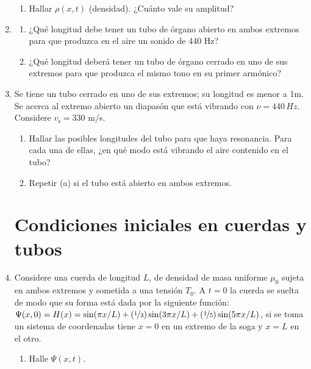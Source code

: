 \documentclass[11pt,spanish]{article}
\begin{document}
\begin{enumerate}
\begin{enumerate}
        \item Hallar $\rho(x,t)$ (densidad). ¿Cuánto vale su amplitud?
    \end{enumerate}


    \item
    \begin{enumerate}
        \item ¿Qué longitud debe tener un tubo de órgano abierto en ambos
        extremos para que produzca en el aire un sonido de 440 Hz?

        \item ¿Qué longitud deberá tener un tubo de órgano cerrado en uno de sus
        extremos para que produzca el mismo tono en su primer armónico?
    \end{enumerate}


    \item Se tiene un tubo cerrado en uno de sus extremos; su longitud es menor
    a 1m. Se acerca al extremo abierto un diapasón que está vibrando con
    $\nu=440\unit{\, Hz}$. Considere $v_\text{s}=330$ m/s.

    \begin{enumerate}
        \item Hallar las posibles longitudes del tubo para que haya resonancia.
        Para cada una de ellas, ¿en qué modo está vibrando el aire contenido en
        el tubo? 
        \item Repetir (a) si el tubo está abierto en ambos extremos.
    \end{enumerate}

\section*{Condiciones iniciales en cuerdas y tubos}


    \item Considere una cuerda de longitud $L$, de densidad de masa uniforme
    $\mu_{0}$ sujeta en ambos extremos y sometida a una tensión $T_{0}$. A $t=0$
    la cuerda se suelta de modo que su forma está dada por la siguiente función:
    $\Psi(x,0)=H(x)=\sin(\pi x/L)+(\nicefrac{1}{3})\sin(3\pi x/L)+(\nicefrac{1}{5})\sin(5\pi x/L)$,
    si se toma un sistema de coordenadas tiene $x=0$ en un extremo de la soga y
    $x=L$ en el otro. 

    \begin{enumerate}
        \item Halle $\Psi(x,t)$.


\end{enumerate}
\end{enumerate}
\end{document}
